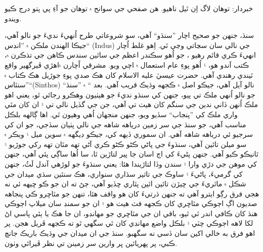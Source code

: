 \documentclass[a4paper]{article}
\begin{document}
خبردار: توهان لاگ اِن ٿيل ناهيو. هن صفحي جي سوانح ۾ توهان جو آءِ پي پتو درج ڪيو ويندو.

سنڌ، جنهن جو صحيح اچار ”سنڌو“ آهي، سو شروعاتي طرح اُنهيءَ نديءَ جو نالو آهي، جيڪا الهندن ملڪن ۾ ”انڊس“ (Indus) جي نالي سان سڃاتي وڃي ٿي. اِهو غلط اُچار انهيءَ ڪري قائم رهيو ، جو اُهو سڪندر اعظم جي ساٿين سندس ڪاهن جي تذڪرن ۾، ڪتب آندو هو، ۽ اُهو پوءِ عام استعمال ۾ اچي ويو. مشرقي اًچارن ۾اهڙي ڦيرگهير واقع ٿيندي رهندي آهي. حضرت عيسيٰ عليه الاسلام کان هڪ صدي پوءِ جوڙيل هڪ ڪتاب ۾ ”سنٿاس“(Sinthos) نالو آيل آهي، جيڪو اصل ۾ ڪجهه وڌيڪ قريب آهي. بعد “ ۾ ”سنڌ“ جو نالو اُنهي ملڪ تي پيو، جنهن کي سنڌو نديءَ جو هيٺيون وهڪرو رجائي ٿو، يعني اهو ملڪ اُنهن ڏاني ندين جي سنگم کان هيٺ تي آهي، جن جي گڏيل نالي تي ۽ ان کان مٿي واري ملڪ کي ”پنجاب“ سڏيو ويو، جنهن منجهان اُهي وهيون ٿي. اها ڳالهه بلڪل مناسب آهي، جو سنڌ جي سر زمين درياهه شاهه جي نالي پٺيان سڏجي، جو ان کي سرجيو ئي درياهه شاهه آهي. ان سموري ڏيهه کي، جيڪو ڊيگهه ۾ سوين ميل ۽ ويڪر ۾ سو ميلن تائين آهي، سنڌوءَ جي پاڻي ڪڻو ڪڻو ڪري آڻي تهه مٿان تهه رکي جوڙيو ۽ ٿانيڪو ڪيو آهي. جنهن پڻيءَ کي اڄ اسان جا پير لتاڙين ٿا، سا اُها ساڳي پئي آهي، جنهن کي موهن جي دڙي وارا ۽ سندن وڏا لتاڙيندا هئا: يعني سنڌوءَ جو لوڙهي آندل لَٽُ، جنهن کي گرميءَ، پاڻيءَ ۽ ساوڪ جي تاثير سڌاري سنواري، هڪ سنئين سڌي ميدان جي شڪل ۾ ماٿريءَ جي ڇيڙن تائين ائين پٿاري ڇڏيو آهي، ڄڻ ته ان جو ڪو ڇيهه ئي نه هجي فرق رڳو ايترو آهي ته جنهن ڌرتيءَ کان هو واقف هئا، تنهن جو مٿاڇرو ڪي پنجاهه صديون اڳ اڄوڪي مٿاڇري کان ڪجهه فٽ هيٺ هو ۽ ان جو سمنڊ سان ميلاپ اڄوڪي هنڌ کان ڪافي اندر ٿي ٿيو، باقي ان جي مٿاڇري جو مهانڊو، ان جا هڪ يا ٻئي پاسي اڻ لکا لاهه اڄوڪي چٽي ۽ بلڪل واضع مهانڊي کان ٿي سگهي ٿو ته ڪجهه ڦريل هجن. پر اهو فرق به خالي اکين سان ڏسي نه سگهبو. سنڌ جي ان ميدان جي وڌيڪ باريڪ جانچ ڪبي، پر پهريائين ڀر وارين سر زمينن تي نظر ڦيرائي وٺون.
\end{document}
